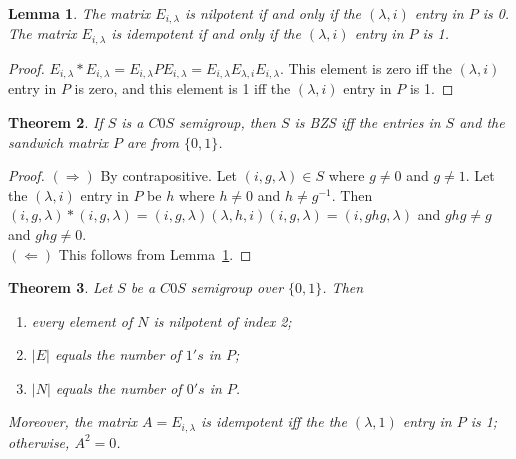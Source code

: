 \documentclass[12pt]{amsart}
\theoremstyle{plain}
\newtheorem{theorem}{Theorem}[section]
\newtheorem{lemma}[theorem]{Lemma}
\theoremstyle{definition}
\begin{document}

\begin {lemma} \label {L:main}
\emph{The matrix $E_{i, \lambda}$ is nilpotent if and only if the $(\lambda, i)$ entry in $P$ is 0. \\The matrix $E_{i, \lambda}$ is idempotent if and only if the $(\lambda, i)$ entry in $P$ is 1. }
\end {lemma}

\begin {proof}
$E_{i, \lambda} * E_{i, \lambda} = E_{i, \lambda}PE_{i, \lambda} =E_{i, \lambda}E_{\lambda, i}E_{i, \lambda} $. This element is zero iff the $(\lambda, i)$ entry in $P$ is zero, and this element is 1 iff the $(\lambda, i)$ entry in $P$ is 1.
\end {proof}



\begin {theorem} \label{T:c0s}
\emph {If $S$ is a $C0S$ semigroup, then $S$ is \emph {BZS} iff the entries in $S$ and the sandwich matrix $P$ are from $\{0, 1\}$. }
\end {theorem}

\begin {proof}
$(\Rightarrow)$ By contrapositive. Let $(i, g, \lambda) \in S$ where $g \neq 0$ and $g \neq 1$. Let the $(\lambda, i)$ entry in $P$ be $h$ where $h \neq 0$ and $h \neq g^{-1}$. Then $(i, g, \lambda) * (i, g, \lambda) = (i, g, \lambda)(\lambda, h, i)  (i, g, \lambda)= (i, ghg, \lambda)$ and $ghg \neq g$ and $ghg \neq 0$.\\
$(\Leftarrow)$ This follows from Lemma~\ref{L:main}.
\end {proof}


\begin {theorem} \label{T:idnil} 
\emph {Let $S$ be a $C0S$ semigroup over $\{0, 1\}$. Then}
\begin {enumerate}
\item \emph {every element of $N$ is nilpotent of index 2;} \label {BBB}
\item \emph {$\vert E \vert$ equals the number of $1's$ in $P$;}
\item \emph {$\vert N \vert$ equals the number of $0's$ in $P$.}
\end {enumerate}
\emph {Moreover, the matrix $A = E_{i, \lambda}$ is idempotent iff the the $(\lambda, 1)$ entry in $P$ is 1; otherwise, $A^2 = 0$. }
\end {theorem}
\end{document}
